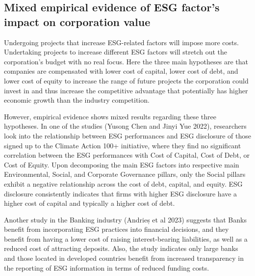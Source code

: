 \documentclass[a4paper, 12pt]{article}
\begin{document}
\vspace{-5pt}
\subsection{Mixed empirical evidence of ESG factor's impact on corporation value}\label{Mixed empirical evidence of ESG factor's impact on corporation value}
\vspace{-10pt}
\hspace{10pt} Undergoing projects that increase ESG-related factors will impose more costs. Undertaking projects to increase different ESG factors will stretch out the corporation's budget with no real focus. Here the three main hypotheses are that companies are compensated with lower cost of capital, lower cost of debt, and lower cost of equity to increase the range of future projects the corporation could invest in and thus increase the competitive advantage that potentially has higher economic growth than the industry competition. 

However, empirical evidence shows mixed results regarding these three hypotheses. In one of the studies (Yusong Chen and Jinyi Yue 2022)\cite{Yusong}, researchers look into the relationship between ESG performances and ESG disclosure of those signed up to the Climate Action 100+ initiative, where they find no
significant correlation between the ESG performances with Cost of Capital, Cost of Debt, or Cost of Equity. Upon decomposing the main ESG factors into respective main Environmental, Social, and Corporate Governance pillars, only the Social pillars exhibit a negative relationship across the cost of debt, capital, and equity. ESG disclosure consistently indicates that firms with higher ESG disclosure have a higher cost of capital and typically a higher cost of debt.

Another study in the Banking industry (Andrieș et al 2023)\cite{Andries} suggests that Banks benefit from incorporating ESG practices into financial decisions, and they benefit from having a lower cost of raising interest-bearing liabilities, as well as a reduced cost of attracting deposits. Also, the study indicates only large banks and those located in developed countries benefit from increased transparency in the reporting of ESG information in
terms of reduced funding costs.
\vspace{-5pt}


\end{document}
